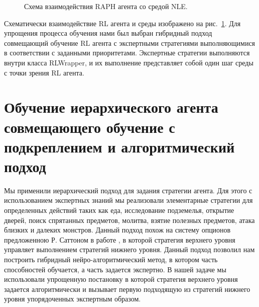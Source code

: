 \begin{figure}[ht]
\caption{Схема взаимодействия RAPH агента со средой NLE.}
    \label{fig:raph_nle}
\end{figure}

Схематически взаимодействие RL агента и среды изображено на рис.~\ref{fig:raph_nle}. Для упрощения процесса обучения нами был выбран гибридный подход совмещающий обучение RL агента с экспертными стратегиями выполняющимися в соответствии с заданными приоритетами. Экспертные стратегии выполняются внутри класса RLWrapper, и их выполнение представляет собой один шаг среды с точки зрения RL агента. 

\section{Обучение иерархического агента совмещающего обучение с подкреплением и алгоритмический подход}

Мы применили иерархический подход для задания стратегии агента. Для этого с использованием экспертных знаний мы реализовали элементарные стратегии для определенных действий таких как еда, исследование подземелья, открытие дверей, поиск спрятанных предметов, молитва, взятие полезных предметов, атака близких и далеких монстров. Данный подход похож на систему опционов предложенною Р. Саттоном в работе \cite{Sutton1999}, в которой стратегия верхнего уровня управляет выполнением стратегий нижнего уровня. Данный подход позволил нам построить гибридный нейро-алгоритмический метод, в котором часть способностей обучается, а часть задается экспертно. В нашей задаче мы использовали упрощенную постановку в которой стратегия верхнего уровня задается алгоритмически и вызывает первую подходящую из стратегий нижнего уровня упорядоченных экспертным образом. 

